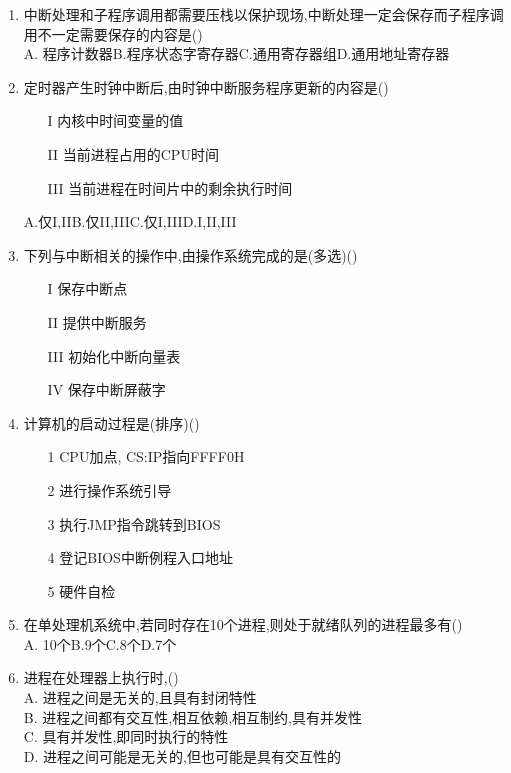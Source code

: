 \documentclass[12pt, a4paper, oneside, UTF8]{ctexbook}
\begin{document}
\begin{enumerate}
    \item \bt\bl 中断处理和子程序调用都需要压栈以保护现场,中断处理一定会保存而子程序调用不一定需要保存的内容是() \\
    A. 程序计数器\qquad B.程序状态字寄存器\qquad C.通用寄存器组\qquad D.通用地址寄存器

    \item \bt 定时器产生时钟中断后,由时钟中断服务程序更新的内容是()
    \begin{enumerate}
        \item [I] 内核中时间变量的值
        \item [II] 当前进程占用的CPU时间
        \item [III] 当前进程在时间片中的剩余执行时间
    \end{enumerate}
    A.仅I,II\qquad B.仅II,III\qquad C.仅I,III\qquad D.I,II,III

    \item \bt\bl 下列与中断相关的操作中,由操作系统完成的是(多选)()  
    \begin{enumerate}
        \item [I] 保存中断点
        \item [II] 提供中断服务
        \item [III] 初始化中断向量表
        \item [IV] 保存中断屏蔽字
    \end{enumerate}

    \item \bl 计算机的启动过程是(排序)() 
    \begin{enumerate}
        \item [1] CPU加点, CS:IP指向FFFF0H
        \item [2] 进行操作系统引导
        \item [3] 执行JMP指令跳转到BIOS
        \item [4] 登记BIOS中断例程入口地址
        \item [5] 硬件自检
    \end{enumerate}

    \item 在单处理机系统中,若同时存在10个进程,则处于就绪队列的进程最多有() \\
    A. 10个\qquad B.9个\qquad C.8个\qquad D.7个 

    \item 进程在处理器上执行时,() \\
    A. 进程之间是无关的,且具有封闭特性 \\
    B. 进程之间都有交互性,相互依赖,相互制约,具有并发性 \\
    C. 具有并发性,即同时执行的特性 \\
    D. 进程之间可能是无关的,但也可能是具有交互性的


\end{enumerate}
\end{document}
